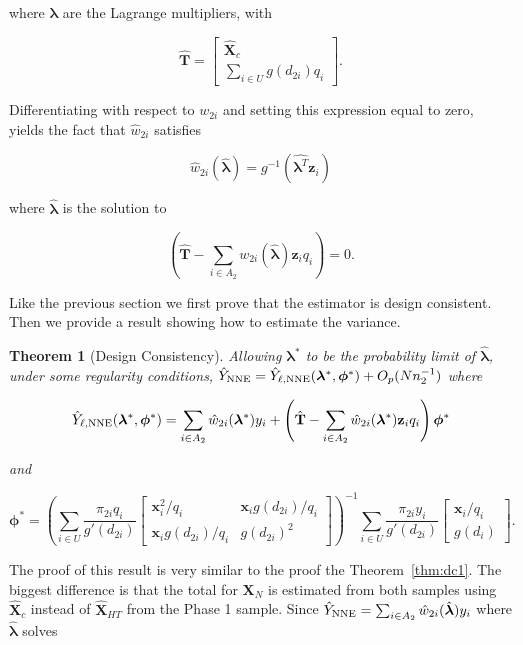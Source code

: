 \documentclass[12pt]{article}
\newtheorem{theorem}{Theorem}
\renewcommand{\bf}[1]{\mathbf{#1}}
\begin{document}
where $\bm \lambda$ are the Lagrange multipliers, with 

$$\hat{\bf T} = 
\begin{bmatrix}
\hat{\bf X}_c \\ \sum_{i \in U} g(d_{2i}) q_i
\end{bmatrix}.
$$

Differentiating with respect to $w_{2i}$ and setting this expression equal to
zero, yields the fact that $\hat w_{2i}$ satisfies 

$$ \hat w_{2i}(\hat{\bm \lambda}) = g^{-1}(\hat{\bm \lambda^T} \bf z_i) $$

where $\hat{\bm \lambda}$ is the solution to

\begin{equation}\label{eq:lamdc2}
  \left( \hat{\bf T} - \sum_{i \in A_2} w_{2i}(\hat{\bm \lambda}) \bf z_i
  q_i\right) = 0.
\end{equation}

Like the previous section we first prove that the estimator is design consistent.
Then we provide a result showing how to estimate the variance.

\begin{theorem}[Design Consistency]\label{thm:dc2}
  Allowing $\bm \lambda^*$ to be the probability limit of $\hat{\bm \lambda}$,
  under some regularity conditions, 
  $\hat Y_{\rm NNE} = \hat Y_{\ell, \rm NNE}(\bm \lambda^*,
  \bm \phi^*) + O_p(Nn_2^{-1})$ where

  $$
  \hat Y_{\ell, \rm NNE}(\bm \lambda^*, \bm \phi^*) = \sum_{i \in A_2} \hat w_{2i}(
  \bm \lambda^*) y_i + \left(\hat{\bf T} - \sum_{i \in A_2} \hat w_{2i}(
  \bm \lambda^*) \bf z_i q_i\right) \bm \phi^*
  $$

  and 

  $$
  \bm \phi^* =
  \left(\sum_{i \in U} \frac{\pi_{2i} q_i}{g'(d_{2i})} 
  \begin{bmatrix}
    \bf x_i^2 / q_i & \bf x_i g(d_{2i}) / q_i \\
    \bf x_i g(d_{2i}) / q_i & g(d_{2i})^2
  \end{bmatrix}
  \right)^{-1}
  \sum_{i \in U} \frac{\pi_{2i} y_i}{g'(d_{2i})} 
  \begin{bmatrix} \bf x_i / q_i \\ g(d_i) \end{bmatrix}.
  $$
\end{theorem}

The proof of this result is very similar to the proof the
Theorem~\ref{thm:dc1}. The biggest difference is that the total for $\bf X_N$ is
estimated from both samples using $\hat{\bf X}_c$ instead of 
$\hat{\bf X}_{HT}$ from the Phase 1 sample. 
Since $\hat Y_{\rm NNE} = \sum_{i \in A_2} \hat w_{2i}(\hat{\bm \lambda})y_i$
where $\hat{\bm \lambda}$ solves
\end{document}

